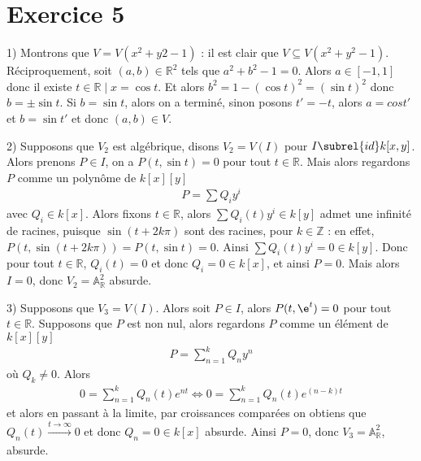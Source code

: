     \section{Exercice 5}
        \begin{question}{1)}
            Montrons que $V = V(x^2 + y2 - 1)$ : il est clair que $V \subseteq V(x^2 + y^2 - 1)$. Réciproquement, soit $(a,b) \in \mathbb{R}^2$ tels que $a^2 + b^2 - 1 = 0$. Alors $a \in [-1,1]$ donc il existe $t \in \mathbb{R} \mid x = \cos t$. Et alors $b^2 = 1 - (\cos t)^2 = (\sin t)^2$ donc $b = \pm \sin t$. Si $b = \sin t$, alors on a terminé, sinon posons $t' = -t$, alors $a = cos t'$ et $b = \sin t'$ et donc $(a,b) \in V$.
        \end{question}
        \begin{question}{2)}
            Supposons que $V_2$ est algébrique, disons $V_2 = V(I)$ pour $I \subrel{id} k[x,y]$. Alors prenons $P \in I$, on a $P(t, \sin t) = 0$ pour tout $t \in \mathbb{R}$. Mais alors regardons $P$ comme un polynôme de $k[x][y]$
            \begin{align*}
                P = \sum Q_i y^i
            \end{align*}
            avec $Q_i \in k[x]$. Alors fixons $t \in \mathbb{R}$, alors $\sum Q_i(t) y^i \in k[y]$ admet une infinité de racines, puisque $\sin (t + 2k\pi)$ sont des racines, pour $k \in \mathbb{Z}$ : en effet, $P(t,\sin (t + 2k\pi)) = P(t, \sin t) = 0$. Ainsi $\sum Q_i(t) y^i =0 \in k[y]$. Donc pour tout $t \in \mathbb{R}$, $Q_i(t) = 0$ et donc $Q_i = 0 \in k[x]$, et ainsi $P = 0$. Mais alors $I = 0$, donc $V_2 = \mathbb{A}_\mathbb{R}^2$ absurde.
        \end{question}
        \begin{question}{3)}
            Supposons que $V_3 = V(I)$. Alors soit $P \in I$, alors $P(t, \e^t) = 0$ pour tout $t \in \mathbb{R}$. Supposons que $P$ est non nul, alors regardons $P$ comme un élément de $k[x][y]$
            \begin{align*}
                P = \sum_{n = 1}^k Q_n y^n
            \end{align*}
            où $Q_k \neq 0$. Alors
            \begin{align*}
                0 = \sum_{n=1}^k Q_n(t) e^{nt} \iff 0 = \sum_{n=1}^k Q_n(t) e^{(n-k)t}
            \end{align*}
            et alors en passant à la limite, par croissances comparées on obtiens que $Q_n(t) \xrightarrow[]{t \to \infty} 0$ et donc $Q_n = 0 \in k[x]$ absurde. Ainsi $P = 0$, donc $V_3 = \mathbb{A}_\mathbb{R}^2$, absurde.
        \end{question}

